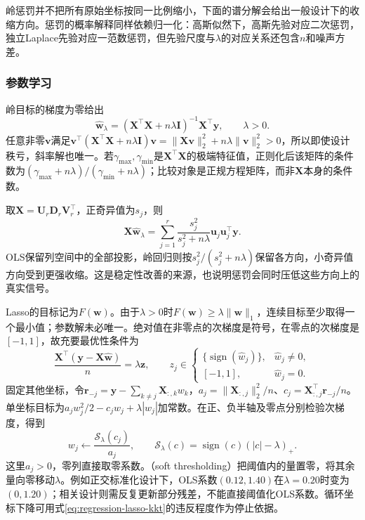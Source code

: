 岭惩罚并不把所有原始坐标按同一比例缩小，下面的谱分解会给出一般设计下的收缩方向。惩罚的概率解释同样依赖归一化：高斯似然下，高斯先验对应二次惩罚，独立Laplace先验对应一范数惩罚，但先验尺度与$\lambda$的对应关系还包含$n$和噪声方差。

\subsubsection{参数学习}
\label{sec:regression-regularization-learning}

岭目标的梯度为零给出
\begin{equation}
  \widehat{\bm{w}}_{\lambda}
  =(\bm{X}^{\top}\bm{X}+n\lambda\bm{I})^{-1}\bm{X}^{\top}\bm{y},
  \qquad\lambda>0.
  \label{eq:regression-ridge-solution}
\end{equation}
任意非零$\bm{v}$满足$\bm{v}^{\top}(\bm{X}^{\top}\bm{X}+n\lambda\bm{I})\bm{v}=\lVert\bm{X}\bm{v}\rVert_2^2+n\lambda\lVert\bm{v}\rVert_2^2>0$，所以即使设计秩亏，斜率解也唯一。若$\gamma_{\max},\gamma_{\min}$是$\bm{X}^{\top}\bm{X}$的极端特征值，正则化后该矩阵的条件数为$(\gamma_{\max}+n\lambda)/(\gamma_{\min}+n\lambda)$；比较对象是正规方程矩阵，而非$\bm{X}$本身的条件数。

取$\bm{X}=\bm{U}_r\bm{D}_r\bm{V}_r^{\top}$，正奇异值为$s_j$，则
\begin{equation}
  \bm{X}\widehat{\bm{w}}_{\lambda}
  =\sum_{j=1}^{r}\frac{s_j^2}{s_j^2+n\lambda}
       \bm{u}_j\bm{u}_j^{\top}\bm{y}.
  \label{eq:regression-ridge-spectral}
\end{equation}
OLS保留列空间中的全部投影，岭回归则按$s_j^2/(s_j^2+n\lambda)$保留各方向，小奇异值方向受到更强收缩。这是稳定性改善的来源，也说明惩罚会同时压低这些方向上的真实信号。

Lasso的目标记为$F(\bm{w})$。由于$\lambda>0$时$F(\bm{w})\geq\lambda\lVert\bm{w}\rVert_1$，连续目标至少取得一个最小值；参数解未必唯一。绝对值在非零点的次梯度是符号，在零点的次梯度是$[-1,1]$，故充要最优性条件为
\begin{equation}
  \frac{\bm{X}^{\top}(\bm{y}-\bm{X}\widehat{\bm{w}})}{n}
  =\lambda\bm{z},\qquad
  z_j\in
  \begin{cases}
    \{\operatorname{sign}(\widehat w_j)\},&\widehat w_j\ne0,\\
    [-1,1],&\widehat w_j=0.
  \end{cases}
  \label{eq:regression-lasso-kkt}
\end{equation}
固定其他坐标，令$\bm{r}_{-j}=\bm{y}-\sum_{k\ne j}\bm{X}_{:,k}w_k$，$a_j=\lVert\bm{X}_{:,j}\rVert_2^2/n$、$c_j=\bm{X}_{:,j}^{\top}\bm{r}_{-j}/n$。单坐标目标为$a_jw_j^2/2-c_jw_j+\lambda|w_j|$加常数。在正、负半轴及零点分别检验次梯度，得到
\begin{equation}
  w_j\leftarrow\frac{\mathcal{S}_{\lambda}(c_j)}{a_j},
  \qquad
  \mathcal{S}_{\lambda}(c)=\operatorname{sign}(c)(|c|-\lambda)_+.
  \label{eq:regression-soft-threshold}
\end{equation}
这里$a_j>0$，零列直接取零系数。（soft thresholding）把阈值内的量置零，将其余量向零移动$\lambda$。例如正交标准化设计下，OLS系数$(0.12,1.40)$在$\lambda=0.20$时变为$(0,1.20)$；相关设计则需反复更新部分残差，不能直接阈值化OLS系数。循环坐标下降可用式\eqref{eq:regression-lasso-kkt}的违反程度作为停止依据。

